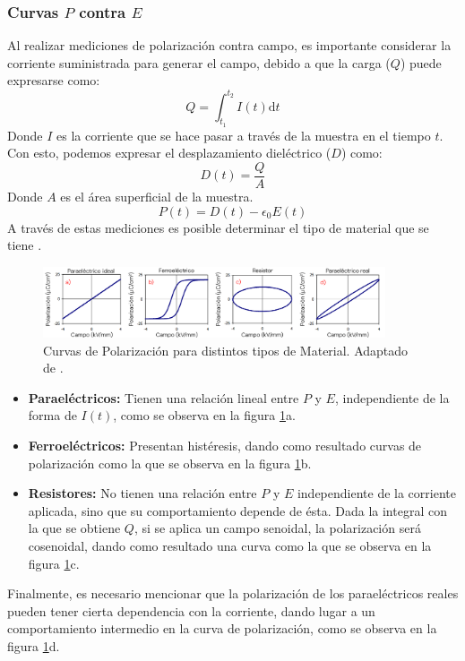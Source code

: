 \documentclass[../main.tex]{subfiles}
\begin{document}
\subsubsection{Curvas \texorpdfstring{$P$}{P} contra \texorpdfstring{$E$}{E}} \label{sec:PEarte}
Al realizar mediciones de polarización contra campo, es importante considerar la corriente suministrada para generar el campo, debido a que la carga ($Q$) puede expresarse como:
\begin{equation}
    Q=\int_{t_1}^{t_2}I(t)\text{d}t
    \label{eq:cargaintensidad}
\end{equation}
Donde $I$ es la corriente que se hace pasar a través de la muestra en el tiempo $t$.
Con esto, podemos expresar el desplazamiento dieléctrico ($D$) como:
\begin{equation}
    D(t)=\dfrac{Q}{A}
    \label{eq:despdielec}
\end{equation}
Donde $A$ es el área superficial de la muestra.
\begin{equation}
    P(t)=D(t)-\epsilon_0E(t)
    \label{eq:polarizacionec}
\end{equation}
A través de estas mediciones es posible determinar el tipo de material que se tiene \cite{Stewart1999}.
\begin{figure}[H]
    \centering
    \includegraphics[width=0.9\textwidth]{fig/PEloop.png}
    \caption{Curvas de Polarización para distintos tipos de Material. Adaptado de \cite{Stewart1999}.}
    \label{fig:PEloop}
\end{figure}
\begin{itemize}
  \item \textbf{Paraeléctricos:} Tienen una relación lineal entre $P$ y $E$, independiente de la forma de $I(t)$, como se observa en la figura \ref{fig:PEloop}a.
  \item \textbf{Ferroeléctricos:} Presentan histéresis, dando como resultado curvas de polarización como la que se observa en la figura \ref{fig:PEloop}b.
  \item \textbf{Resistores:} No tienen una relación entre $P$ y $E$ independiente de la corriente aplicada, sino que su comportamiento depende de ésta. Dada la integral con la que se obtiene $Q$, si se aplica un campo senoidal, la polarización será cosenoidal, dando como resultado una curva como la que se observa en la figura \ref{fig:PEloop}c.
\end{itemize}
Finalmente, es necesario mencionar que la polarización de los paraeléctricos reales pueden tener cierta dependencia con la corriente, dando lugar a un comportamiento intermedio en la curva de polarización, como se observa en la figura \ref{fig:PEloop}d.
\end{document}
